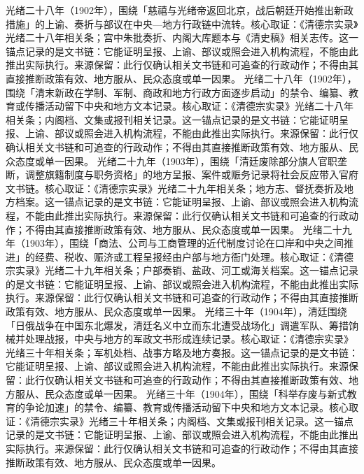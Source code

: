 光绪二十八年（1902年），围绕「慈禧与光绪帝返回北京，战后朝廷开始推出新政措施」的上谕、奏折与部议在中央—地方行政链中流转。核心取证：《清德宗实录》光绪二十八年相关条；宫中朱批奏折、内阁大库题本与《清史稿》相关志传。这一锚点记录的是文书链：它能证明呈报、上谕、部议或照会进入机构流程，不能由此推出实际执行。来源保留：此行仅确认相关文书链和可追查的行政动作；不得由其直接推断政策有效、地方服从、民众态度或单一因果。
光绪二十八年（1902年），围绕「清末新政在学制、军制、商政和地方行政方面逐步启动」的禁令、编纂、教育或传播活动留下中央和地方文本记录。核心取证：《清德宗实录》光绪二十八年相关条；内阁档、文集或报刊相关记录。这一锚点记录的是文书链：它能证明呈报、上谕、部议或照会进入机构流程，不能由此推出实际执行。来源保留：此行仅确认相关文书链和可追查的行政动作；不得由其直接推断政策有效、地方服从、民众态度或单一因果。
光绪二十九年（1903年），围绕「清廷废除部分旗人官职垄断，调整旗籍制度与职务资格」的地方呈报、案件或赈务记录将社会反应带入官府文书链。核心取证：《清德宗实录》光绪二十九年相关条；地方志、督抚奏折及地方档案。这一锚点记录的是文书链：它能证明呈报、上谕、部议或照会进入机构流程，不能由此推出实际执行。来源保留：此行仅确认相关文书链和可追查的行政动作；不得由其直接推断政策有效、地方服从、民众态度或单一因果。
光绪二十九年（1903年），围绕「商法、公司与工商管理的近代制度讨论在口岸和中央之间推进」的经费、税收、赈济或工程呈报经由户部与地方衙门处理。核心取证：《清德宗实录》光绪二十九年相关条；户部奏销、盐政、河工或海关档案。这一锚点记录的是文书链：它能证明呈报、上谕、部议或照会进入机构流程，不能由此推出实际执行。来源保留：此行仅确认相关文书链和可追查的行政动作；不得由其直接推断政策有效、地方服从、民众态度或单一因果。
光绪三十年（1904年），清廷围绕「日俄战争在中国东北爆发，清廷名义中立而东北遭受战场化」调遣军队、筹措饷械并处理战报，中央与地方的军政文书形成连续记录。核心取证：《清德宗实录》光绪三十年相关条；军机处档、战事方略及地方奏报。这一锚点记录的是文书链：它能证明呈报、上谕、部议或照会进入机构流程，不能由此推出实际执行。来源保留：此行仅确认相关文书链和可追查的行政动作；不得由其直接推断政策有效、地方服从、民众态度或单一因果。
光绪三十年（1904年），围绕「科举存废与新式教育的争论加速」的禁令、编纂、教育或传播活动留下中央和地方文本记录。核心取证：《清德宗实录》光绪三十年相关条；内阁档、文集或报刊相关记录。这一锚点记录的是文书链：它能证明呈报、上谕、部议或照会进入机构流程，不能由此推出实际执行。来源保留：此行仅确认相关文书链和可追查的行政动作；不得由其直接推断政策有效、地方服从、民众态度或单一因果。

